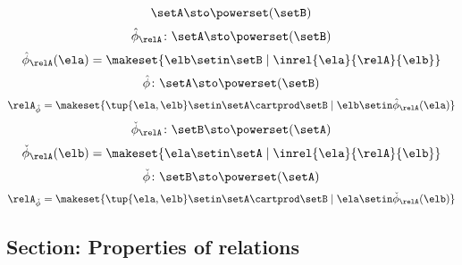\begin{forslides}
    \begin{equation}
        \label{eq:slides_session2_rel_117}
        \setA  \sto \powerset (\setB)
    \end{equation}
    \begin{equation}
        \label{eq:slides_session2_rel_118}
        \hat \phi_{\relA} \colon \setA \sto \powerset (\setB)
    \end{equation}
    \begin{equation}
        \label{eq:slides_session2_rel_119}
        \hat \phi_{\relA} (\ela) = \makeset{ \elb \setin \setB \mid \inrel{\ela}{\relA}{\elb}}
    \end{equation}
    \begin{equation}
        \label{eq:slides_session2_rel_120}
        \hat \phi \colon \setA \sto \powerset (\setB)
    \end{equation}
    \begin{equation}
        \label{eq:slides_session2_rel_121}
        \relA_{\hat \phi} = \makeset{ \tup{\ela, \elb} \setin \setA \cartprod \setB \mid \elb \setin \hat \phi_{\relA}(\ela)  }
    \end{equation}
    \begin{equation}
        \label{eq:slides_session2_rel_122}
        \check \phi_{\relA} \colon \setB \sto \powerset (\setA)
    \end{equation}
    \begin{equation}
        \label{eq:slides_session2_rel_123}
        \check \phi_{\relA} (\elb) = \makeset{ \ela \setin \setA \mid \inrel{\ela}{\relA}{\elb}}
    \end{equation}
    \begin{equation}
        \label{eq:slides_session2_rel_124}
        \check \phi \colon \setB \sto \powerset (\setA)
    \end{equation}
    \begin{equation}
        \label{eq:slides_session2_rel_125}
        \relA_{\check \phi} = \makeset{ \tup{\ela, \elb} \setin \setA \cartprod \setB \mid \ela \setin \check \phi_{\relA}(\elb)}
    \end{equation}

    \subsection{Section: Properties of relations}


\end{forslides}
